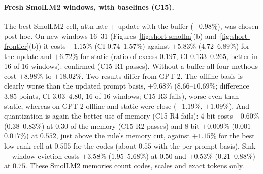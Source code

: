 \documentclass[10pt]{article}
\theoremstyle{plain}
\theoremstyle{definition}
\theoremstyle{remark}
\newcommand{\rl}[1]{\textsf{#1}}%
\begin{document}
\paragraph{Fresh SmolLM2 windows, with baselines (C15).} The best SmolLM2 cell, attn-late + update with the buffer ($+0.98\%$), was chosen post hoc. On new windows 16--31 (Figures~\ref{fig:short-smollm}(b) and~\ref{fig:short-frontier}(b)) it costs $+1.15\%$ (CI $0.74$--$1.57\%$) against $+5.83\%$ ($4.72$--$6.89\%$) for the update and $+6.72\%$ for static (ratio of excess $0.197$, CI $0.133$--$0.265$, better in 16 of 16 windows): confirmed (\rl{C15-R1} passes). Without a buffer all four methods cost $+8.98\%$ to $+18.02\%$. Two results differ from GPT-2. The offline basis is clearly worse than the updated prompt basis, $+9.68\%$ ($8.66$--$10.69\%$; difference $3.85$ points, CI $3.03$--$4.80$, 16 of 16 windows; \rl{C15-R3} fails), worse even than static, whereas on GPT-2 offline and static were close ($+1.19\%$, $+1.09\%$). And quantization is again the better use of memory (\rl{C15-R4} fails): 4-bit costs $+0.60\%$ ($0.38$--$0.83\%$) at $0.30$ of the memory (\rl{C15-R2} passes) and 8-bit $+0.009\%$ ($0.001$--$0.017\%$) at $0.552$, just above the rule's memory cut, against $+1.15\%$ for the best low-rank cell at $0.505$ for the codes (about $0.55$ with the per-prompt basis). Sink + window eviction costs $+3.58\%$ ($1.95$--$5.68\%$) at $0.50$ and $+0.53\%$ ($0.21$--$0.88\%$) at $0.75$. These SmolLM2 memories count codes, scales and exact tokens only.
\end{document}
